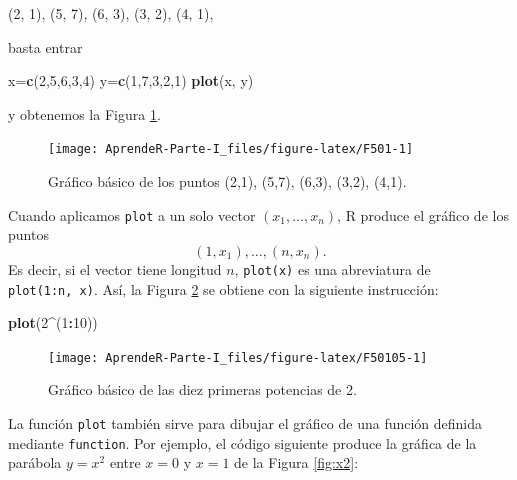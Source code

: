 \documentclass[]{book}
\newenvironment{Shaded}{\begin{snugshade}}{\end{snugshade}}
\newcommand{\DecValTok}[1]{\textcolor[rgb]{0.00,0.00,0.81}{#1}}
\newcommand{\KeywordTok}[1]{\textcolor[rgb]{0.13,0.29,0.53}{\textbf{#1}}}
\newcommand{\NormalTok}[1]{#1}
\newcommand{\OperatorTok}[1]{\textcolor[rgb]{0.81,0.36,0.00}{\textbf{#1}}}
\theoremstyle{definition}
\theoremstyle{definition}
\theoremstyle{definition}
\theoremstyle{remark}
\begin{document}
(2, 1), (5, 7), (6, 3), (3, 2), (4, 1),

basta entrar

\begin{Shaded}
\begin{Highlighting}[]
\NormalTok{x=}\KeywordTok{c}\NormalTok{(}\DecValTok{2}\NormalTok{,}\DecValTok{5}\NormalTok{,}\DecValTok{6}\NormalTok{,}\DecValTok{3}\NormalTok{,}\DecValTok{4}\NormalTok{)}
\NormalTok{y=}\KeywordTok{c}\NormalTok{(}\DecValTok{1}\NormalTok{,}\DecValTok{7}\NormalTok{,}\DecValTok{3}\NormalTok{,}\DecValTok{2}\NormalTok{,}\DecValTok{1}\NormalTok{)}
\KeywordTok{plot}\NormalTok{(x, y)}
\end{Highlighting}
\end{Shaded}

y obtenemos la Figura \ref{fig:F501}.

\begin{figure}

{\centering \texttt{[image: AprendeR-Parte-I\_files/figure-latex/F501-1]} 

}

\caption{Gráfico básico de los puntos (2,1), (5,7), (6,3), (3,2), (4,1).}\label{fig:F501}
\end{figure}

Cuando aplicamos \texttt{plot} a un solo vector \((x_1, \ldots, x_n)\), R produce el gráfico de los puntos
\[
(1, x_1), \ldots, (n, x_n).
\]
Es decir, si el vector tiene longitud \(n\), \texttt{plot(x)} es una abreviatura de \texttt{plot(1:n,\ x)}. Así, la Figura \ref{fig:F50105} se obtiene con la siguiente instrucción:

\begin{Shaded}
\begin{Highlighting}[]
\KeywordTok{plot}\NormalTok{(}\DecValTok{2}\OperatorTok{^}\NormalTok{(}\DecValTok{1}\OperatorTok{:}\DecValTok{10}\NormalTok{))}
\end{Highlighting}
\end{Shaded}

\begin{figure}

{\centering \texttt{[image: AprendeR-Parte-I\_files/figure-latex/F50105-1]} 

}

\caption{Gráfico básico de las diez primeras potencias de 2.}\label{fig:F50105}
\end{figure}

La función \texttt{plot} también sirve para dibujar el gráfico de una función definida mediante \texttt{function}.
Por ejemplo, el código siguiente produce la gráfica de la parábola \(y=x^2\) entre \(x=0\) y \(x=1\) de la Figura \ref{fig:x2}:
\end{document}

